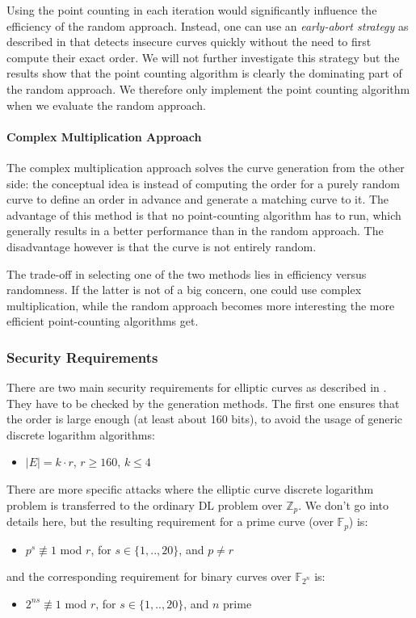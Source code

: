 \documentclass[11pt,english]{article}
\begin{document}
Using the point counting in each iteration would significantly influence the efficiency of the random approach. Instead, one can use an \emph{early-abort strategy} as described in \cite{satohfgh} that detects insecure curves quickly without the need to first compute their exact order. We will not further investigate this strategy but the results show that the point counting algorithm is clearly the dominating part of the random approach. We therefore only implement the point counting algorithm when we evaluate the random approach.

\paragraph{Complex Multiplication Approach}
The complex multiplication approach solves the curve generation from the other side: the conceptual idea is instead of computing the order for a purely random curve to define an order in advance and generate a matching curve to it.
The advantage of this method is that no point-counting algorithm has to run, which generally results in a better performance than in the random approach. The disadvantage however is that the curve is not entirely random.

The trade-off in selecting one of the two methods lies in efficiency versus randomness. If the latter is not of a big concern, one could use complex multiplication, while the random approach becomes more interesting the more efficient point-counting algorithms get.

\subsubsection{Security Requirements}
There are two main security requirements for elliptic curves as described in \cite{buchmann}. They have to be checked by the generation methods. The first one ensures that the order is large enough (at least about 160 bits), to avoid the usage of generic discrete logarithm algorithms:
\begin{itemize}
 \item $|E|=k\cdot r$, $r\geq 160$, $k\leq 4$
\end{itemize}
There are more specific attacks where the elliptic curve discrete logarithm problem is transferred to the ordinary DL problem over $\mathbb{Z}_p$. We don't go into details here, but the resulting requirement for a prime curve (over $\mathbb{F}_p$) is:
\begin{itemize}
 \item $p^s\not\equiv 1$ mod $r$, for $s\in\{1,..,20\}$, and $p\neq r$
\end{itemize}
and the corresponding requirement for binary curves over $\mathbb{F}_{2^n}$ is:
\begin{itemize}
 \item $2^{ns}\not\equiv 1$ mod $r$, for $s\in\{1,..,20\}$, and $n$ prime
\end{itemize}
\end{document}
